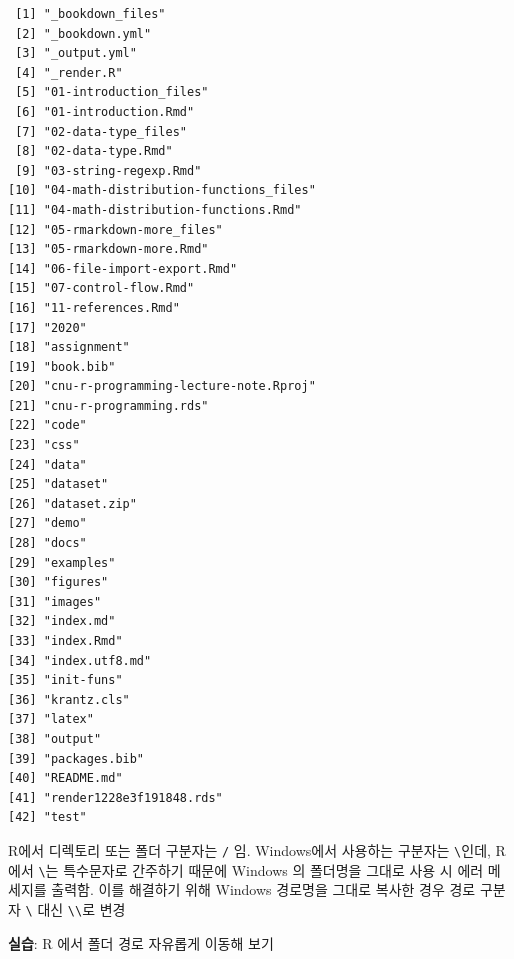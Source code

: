 \documentclass[
  11pt,
]{krantz}
\makeatletter
\newenvironment{kframe}{%
\medskip{}
\setlength{\fboxsep}{.8em}
 \def\at@end@of@kframe{}%
 \ifinner\ifhmode%
  \def\at@end@of@kframe{\end{minipage}}%
  \begin{minipage}{\columnwidth}%
 \fi\fi%
 \def\FrameCommand##1{\hskip\@totalleftmargin \hskip-\fboxsep
 \colorbox{shadecolor}{##1}\hskip-\fboxsep
     \hskip-\linewidth \hskip-\@totalleftmargin \hskip\columnwidth}%
 \MakeFramed {\advance\hsize-\width
   \@totalleftmargin\z@ \linewidth\hsize
   \@setminipage}}%
 {\par\unskip\endMakeFramed%
 \at@end@of@kframe}
\newenvironment{rmdblock}[1]
  {
  \begin{itemize}
  \renewcommand{\labelitemi}{
    \raisebox{-.7\height}[0pt][0pt]{
      {\setkeys{Gin}{width=3em,keepaspectratio}\texttt{[image: images/\#1]}}
    }
  }
  \setlength{\fboxsep}{1em}
  \begin{kframe}
  \item
  }
  {
  \end{kframe}
  \end{itemize}
  }
\newenvironment{rmdcaution}
  {\begin{rmdblock}{caution}}
  {\end{rmdblock}}
\makeatother
\begin{document}
\begin{verbatim}
 [1] "_bookdown_files"                     
 [2] "_bookdown.yml"                       
 [3] "_output.yml"                         
 [4] "_render.R"                           
 [5] "01-introduction_files"               
 [6] "01-introduction.Rmd"                 
 [7] "02-data-type_files"                  
 [8] "02-data-type.Rmd"                    
 [9] "03-string-regexp.Rmd"                
[10] "04-math-distribution-functions_files"
[11] "04-math-distribution-functions.Rmd"  
[12] "05-rmarkdown-more_files"             
[13] "05-rmarkdown-more.Rmd"               
[14] "06-file-import-export.Rmd"           
[15] "07-control-flow.Rmd"                 
[16] "11-references.Rmd"                   
[17] "2020"                                
[18] "assignment"                          
[19] "book.bib"                            
[20] "cnu-r-programming-lecture-note.Rproj"
[21] "cnu-r-programming.rds"               
[22] "code"                                
[23] "css"                                 
[24] "data"                                
[25] "dataset"                             
[26] "dataset.zip"                         
[27] "demo"                                
[28] "docs"                                
[29] "examples"                            
[30] "figures"                             
[31] "images"                              
[32] "index.md"                            
[33] "index.Rmd"                           
[34] "index.utf8.md"                       
[35] "init-funs"                           
[36] "krantz.cls"                          
[37] "latex"                               
[38] "output"                              
[39] "packages.bib"                        
[40] "README.md"                           
[41] "render1228e3f191848.rds"             
[42] "test"                                
\end{verbatim}

\normalsize

\footnotesize

\begin{rmdcaution}
R에서 디렉토리 또는 폴더 구분자는 \texttt{/} 임. Windows에서 사용하는 구분자는 \texttt{\textbackslash{}}인데, R에서 \texttt{\textbackslash{}}는 특수문자로 간주하기 때문에 Windows 의 폴더명을 그대로 사용 시 에러 메세지를 출력함. 이를 해결하기 위해 Windows 경로명을 그대로 복사한 경우 경로 구분자 \texttt{\textbackslash{}} 대신 \texttt{\textbackslash{}\textbackslash{}}로 변경

\textbf{실습}: R 에서 폴더 경로 자유롭게 이동해 보기
\end{rmdcaution}
\end{document}
